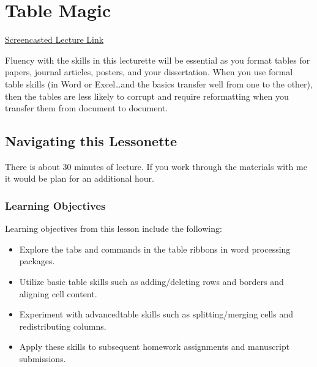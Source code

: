 \documentclass[
  english,
]{book}
\providecommand{\tightlist}{%
  \setlength{\itemsep}{0pt}\setlength{\parskip}{0pt}}
\begin{document}
\hypertarget{Tables}{%
\chapter{Table Magic}\label{Tables}}

\href{https://spu.hosted.panopto.com/Panopto/Pages/Viewer.aspx?pid=5f6035f2-0aff-476b-829c-ac240184c580}{Screencasted Lecture Link}

Fluency with the skills in this lecturette will be essential as you format tables for papers, journal articles, posters, and your dissertation. When you use formal table skills (in Word or Excel\ldots and the basics transfer well from one to the other), then the tables are less likely to corrupt and require reformatting when you transfer them from document to document.

\hypertarget{navigating-this-lessonette-1}{%
\section{Navigating this Lessonette}\label{navigating-this-lessonette-1}}

There is about 30 minutes of lecture. If you work through the materials with me it would be plan for an additional hour.

\hypertarget{learning-objectives-8}{%
\subsection{Learning Objectives}\label{learning-objectives-8}}

Learning objectives from this lesson include the following:

\begin{itemize}
\tightlist
\item
  Explore the tabs and commands in the table ribbons in word processing packages.
\item
  Utilize basic table skills such as adding/deleting rows and borders and aligning cell content.
\item
  Experiment with advancedtable skills such as splitting/merging cells and redistributing columns.
\item
  Apply these skills to subsequent homework assignments and manuscript submissions.
\end{itemize}
\end{document}
